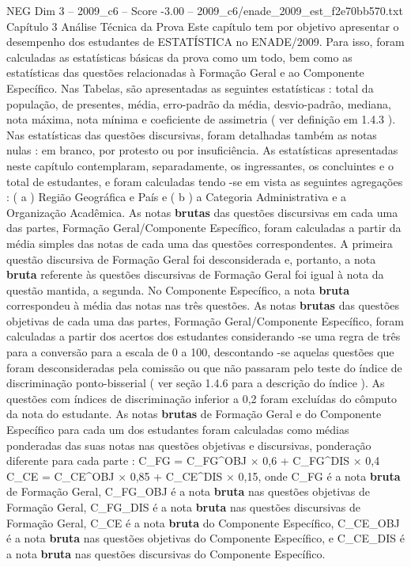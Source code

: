 \begin{textsample}{NEG Dim 3 – 2009\_c6 – Score -3.00 – 2009\_c6/enade\_2009\_est\_f2e70bb570.txt}  \label{ex:f3_neg_044}
Capítulo 3 Análise Técnica da Prova Este capítulo tem por objetivo apresentar o desempenho dos estudantes de ESTATÍSTICA no ENADE/2009.
Para isso, foram calculadas as estatísticas básicas da prova como um todo, bem como as estatísticas das questões relacionadas à Formação Geral e ao Componente Específico.
Nas Tabelas, são apresentadas as seguintes estatísticas : total da população, de presentes, média, erro-padrão da média, desvio-padrão, mediana, nota máxima, nota mínima e coeficiente de assimetria ( ver definição em 1.4.3 ).
Nas estatísticas das questões discursivas, foram detalhadas também as notas nulas : em branco, por protesto ou por insuficiência.
As estatísticas apresentadas neste capítulo contemplaram, separadamente, os ingressantes, os concluintes e o total de estudantes, e foram calculadas tendo -se em vista as seguintes agregações : ( a ) Região Geográfica e País e ( b ) a Categoria Administrativa e a Organização Acadêmica.
As notas \textbf{brutas} das questões discursivas em cada uma das partes, Formação Geral/Componente Específico, foram calculadas a partir da média simples das notas de cada uma das questões correspondentes.
A primeira questão discursiva de Formação Geral foi desconsiderada e, portanto, a nota \textbf{bruta} referente às questões discursivas de Formação Geral foi igual à nota da questão mantida, a segunda.
No Componente Específico, a nota \textbf{bruta} correspondeu à média das notas nas três questões.
As notas \textbf{brutas} das questões objetivas de cada uma das partes, Formação Geral/Componente Específico, foram calculadas a partir dos acertos dos estudantes considerando -se uma regra de três para a conversão para a escala de 0 a 100, descontando -se aquelas questões que foram desconsideradas pela comissão ou que não passaram pelo teste do índice de discriminação ponto-bisserial ( ver seção 1.4.6 para a descrição do índice ).
As questões com índices de discriminação inferior a 0,2 foram excluídas do cômputo da nota do estudante.
As notas \textbf{brutas} de Formação Geral e do Componente Específico para cada um dos estudantes foram calculadas como médias ponderadas das suas notas nas questões objetivas e discursivas, ponderação diferente para cada parte : C\_FG = C\_FG\textasciicircum{}OBJ × 0,6 + C\_FG\textasciicircum{}DIS × 0,4 C\_CE = C\_CE\textasciicircum{}OBJ × 0,85 + C\_CE\textasciicircum{}DIS × 0,15, onde C\_FG é a nota \textbf{bruta} de Formação Geral, C\_FG\_OBJ é a nota \textbf{bruta} nas questões objetivas de Formação Geral, C\_FG\_DIS é a nota \textbf{bruta} nas questões discursivas de Formação Geral, C\_CE é a nota \textbf{bruta} do Componente Específico, C\_CE\_OBJ é a nota \textbf{bruta} nas questões objetivas do Componente Específico, e C\_CE\_DIS é a nota \textbf{bruta} nas questões discursivas do Componente Específico.

\end{textsample}
